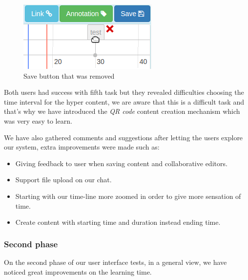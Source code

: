 \begin{figure}[!htb]
\centering
\begin{minipage}[b]{0.3\linewidth}
\centering

    \includegraphics[width=\textwidth]{figures/test_ui_05.png}
\end{minipage}


    \caption{Save button that was removed}
    \label{fig:test_ui_05}
\end{figure}

Both users had success with fifth task but they revealed difficulties choosing the time interval for the hyper content, we are aware that this is a difficult task and that's why we have introduced the \emph{QR code} content creation mechanism which was very easy to learn.

We have also gathered comments and suggestions after letting the users explore our system, extra improvements were made such as:

\begin{itemize}
\item Giving feedback to user when saving content and collaborative editors.
\item Support file upload on our chat.
\item Starting with our time-line more zoomed in order to give more sensation of time.
\item Create content with starting time and duration instead ending time.
\end{itemize}

  \subsubsection {Second phase}

On the second phase of our user interface tests, in a general view, we have noticed great improvements on the learning time.


